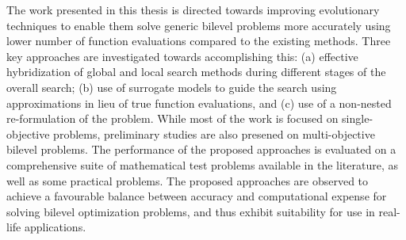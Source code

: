 The work presented in this thesis is directed towards improving evolutionary techniques to enable them solve generic bilevel problems more accurately using lower number of function evaluations compared to the existing methods. Three key approaches are investigated towards accomplishing this: (a) effective hybridization of global and local search methods during different stages of the overall search; (b) use of surrogate models to guide the search using approximations in lieu of true function evaluations, and (c) use of a non-nested re-formulation of the problem. While most of the work is focused on single-objective problems, preliminary studies are also presened on multi-objective bilevel problems. The performance of the proposed approaches is evaluated on a comprehensive suite of mathematical test problems available in the literature, as well as some practical problems. The proposed approaches are observed to achieve a favourable balance between accuracy and computational expense for solving bilevel optimization problems, and thus exhibit suitability for use in real-life applications. 

